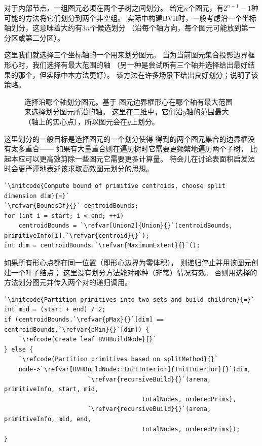 对于内部节点，一组图元必须在两个子树之间划分。
给定$n$个图元，有$2^{n-1}-1$种
可能的方法将它们划分到两个非空组。
实际中构建BVH时，一般考虑沿一个坐标轴划分，这意味着大约有$3n$个候选划分
（沿每个轴方向，每个图元可能放到第一分区或第二分区）。

这里我们就选择三个坐标轴的一个用来划分图元。
当为当前图元集合投影边界框形心时，我们选择有最大范围的轴
（另一种是尝试所有三个轴并选择给出最好结果的那个，但实际中本方法更好）。
该方法在许多场景下给出良好划分；说明了该策略。
\begin{figure}[htbp]
    \centering
    \caption{选择沿哪个轴划分图元。\protect{}基于
        图元边界框形心在哪个轴有最大范围来选择划分图元所沿的轴。
        这里在二维中，它们沿$y$轴的范围最大（轴上的实心点），所以图元会在$y$上划分。}
    \label{fig:4.3}
\end{figure}

这里划分的一般目标是选择图元的一个划分使得
得到的两个图元集合的边界框没有太多重合——
如果有大量重合则在遍历树时它需要更频繁地遍历两个子树，
比起本应可以更高效剪除一些图元它需要更多计算量。
待会儿在讨论表面积启发法时会更严谨地表述该求取高效图元划分的思想。
\begin{lstlisting}
`\initcode{Compute bound of primitive centroids, choose split dimension dim}{=}`
`\refvar{Bounds3f}{}` centroidBounds;
for (int i = start; i < end; ++i)
    centroidBounds = `\refvar[Union2]{Union}{}`(centroidBounds, primitiveInfo[i].`\refvar{centroid}{}`);
int dim = centroidBounds.`\refvar{MaximumExtent}{}`();
\end{lstlisting}

如果所有形心点都在同一位置（即形心边界为零体积），
则递归停止并用该图元创建一个叶子结点；
这里没有划分方法能对那种（非常）情况有效。
否则用选择的方法划分图元并传入两个对的递归调用。
\begin{lstlisting}
`\initcode{Partition primitives into two sets and build children}{=}`
int mid = (start + end) / 2;
if (centroidBounds.`\refvar{pMax}{}`[dim] == centroidBounds.`\refvar{pMin}{}`[dim]) {
    `\refcode{Create leaf BVHBuildNode}{}`
} else {
    `\refcode{Partition primitives based on splitMethod}{}`
    node->`\refvar[BVHBuildNode::InitInterior]{InitInterior}{}`(dim,
                       `\refvar{recursiveBuild}{}`(arena, primitiveInfo, start, mid,
                                      totalNodes, orderedPrims),
                       `\refvar{recursiveBuild}{}`(arena, primitiveInfo, mid, end,
                                      totalNodes, orderedPrims));
}
\end{lstlisting}

